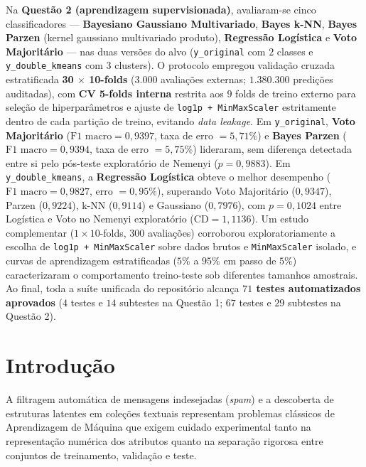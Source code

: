 \documentclass[a4paper,11pt]{article}
\begin{document}
Na \textbf{Questão 2 (aprendizagem supervisionada)}, avaliaram-se cinco classificadores --- \textbf{Bayesiano Gaussiano Multivariado}, \textbf{Bayes k-NN}, \textbf{Bayes Parzen} (kernel gaussiano multivariado produto), \textbf{Regressão Logística} e \textbf{Voto Majoritário} --- nas duas versões do alvo (\texttt{y\_\allowbreak original} com $2$ classes e \texttt{y\_\allowbreak double\_\allowbreak kmeans} com $3$ clusters). O protocolo empregou validação cruzada estratificada \textbf{30 $\times$ 10-folds} ($3.000$ avaliações externas; $1.380.300$ predições auditadas), com \textbf{CV 5-folds interna} restrita aos $9$ folds de treino externo para seleção de hiperparâmetros e ajuste de \texttt{log1p + MinMaxScaler} estritamente dentro de cada partição de treino, evitando \textit{data leakage}. Em \texttt{y\_\allowbreak original}, \textbf{Voto Majoritário} ($\text{F1 macro} = 0,9397$, taxa de erro $= 5,71\%$) e \textbf{Bayes Parzen} ($\text{F1 macro} = 0,9394$, taxa de erro $= 5,75\%$) lideraram, sem diferença detectada entre si pelo pós-teste exploratório de Nemenyi ($p = 0,9883$). Em \texttt{y\_\allowbreak double\_\allowbreak kmeans}, a \textbf{Regressão Logística} obteve o melhor desempenho ($\text{F1 macro} = 0,9827$, erro $= 0,95\%$), superando Voto Majoritário ($0,9347$), Parzen ($0,9224$), k-NN ($0,9114$) e Gaussiano ($0,7976$), com $p = 0,1024$ entre Logística e Voto no Nemenyi exploratório ($\text{CD} = 1,1136$). Um estudo complementar ($1 \times 10$-folds, $300$ avaliações) corroborou exploratoriamente a escolha de \texttt{log1p + MinMaxScaler} sobre dados brutos e \texttt{MinMaxScaler} isolado, e curvas de aprendizagem estratificadas ($5\%$ a $95\%$ em passo de $5\%$) caracterizaram o comportamento treino-teste sob diferentes tamanhos amostrais. Ao final, toda a suíte unificada do repositório alcança \textbf{$71$ testes automatizados aprovados} ($4$ testes e $14$ subtestes na Questão 1; $67$ testes e $29$ subtestes na Questão 2).


\tableofcontents
\newpage


\section{Introdução}\label{sec:1-introducao}


A filtragem automática de mensagens indesejadas (\textit{spam}) e a descoberta de estruturas latentes em coleções textuais representam problemas clássicos de Aprendizagem de Máquina que exigem cuidado experimental tanto na representação numérica dos atributos quanto na separação rigorosa entre conjuntos de treinamento, validação e teste.
\end{document}
